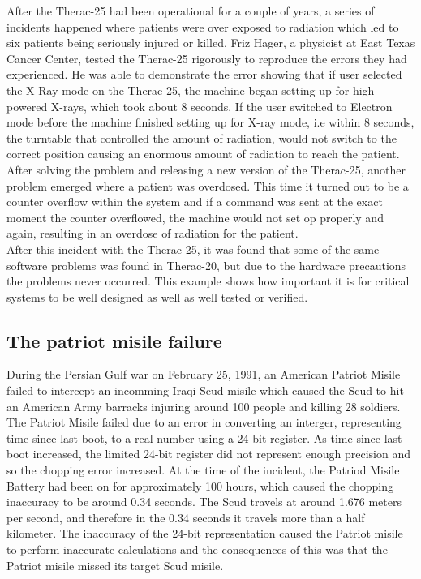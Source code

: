 After the Therac-25 had been operational for a couple of years, a series of incidents happened where patients were over exposed to radiation which led to six patients being seriously injured or killed. Friz Hager, a physicist at East Texas Cancer Center, tested the Therac-25 rigorously to reproduce the errors they had experienced. He was able to demonstrate the error showing that if user selected the X-Ray mode on the Therac-25, the machine began setting up for high-powered X-rays, which took about 8 seconds. If the user switched to Electron mode before the machine finished setting up for X-ray mode, i.e within 8 seconds, the turntable that controlled the amount of radiation, would not switch to the correct position causing an enormous amount of radiation to reach the patient.\\
After solving the problem and releasing a new version of the Therac-25, another problem emerged where a patient was overdosed. This time it turned out to be a counter overflow within the system and if a command was sent at the exact moment the counter overflowed, the machine would not set op properly and again, resulting in an overdose of radiation for the patient. \\
After this incident with the Therac-25, it was found that some of the same software problems was found in Therac-20, but due to the hardware precautions the problems never occurred.
This example shows how important it is for critical systems to be well designed as well as well tested or verified.

\subsection{The patriot misile failure}
During the Persian Gulf war on February 25, 1991, an American Patriot Misile failed to intercept an incomming Iraqi Scud misile which caused the Scud to hit an American Army barracks injuring around 100 people and killing 28 soldiers.\\

The Patriot Misile failed due to an error in converting an interger, representing time since last boot, to a real number using a 24-bit register. As time since last boot increased, the limited 24-bit register did not represent enough precision and so the chopping error increased. At the time of the incident, the Patriod Misile Battery had been on for approximately 100 hours, which caused the chopping inaccuracy to be around 0.34 seconds. The Scud travels at around 1.676 meters per second, and therefore in the 0.34 seconds it travels more than a half kilometer. The inaccuracy of the 24-bit representation caused the Patriot misile to perform inaccurate calculations and the consequences of this was that the Patriot misile missed its target Scud misile.
